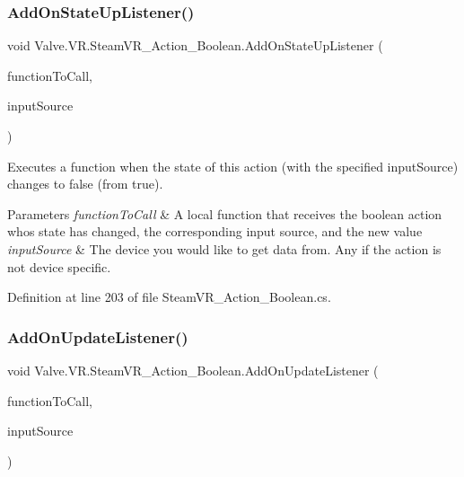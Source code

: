\subsubsection{\texorpdfstring{AddOnStateUpListener()}{AddOnStateUpListener()}}
{\footnotesize\ttfamily void Valve.\+V\+R.\+Steam\+V\+R\+\_\+\+Action\+\_\+\+Boolean.\+Add\+On\+State\+Up\+Listener (\begin{DoxyParamCaption}\item[{\mbox{\hyperlink{class_valve_1_1_v_r_1_1_steam_v_r___action___boolean_a87ebada25dac6016557c3b81e6324b90}{State\+Up\+Handler}}}]{function\+To\+Call,  }\item[{\mbox{\hyperlink{namespace_valve_1_1_v_r_a82e5bf501cc3aa155444ee3f0662853f}{Steam\+V\+R\+\_\+\+Input\+\_\+\+Sources}}}]{input\+Source }\end{DoxyParamCaption})}



Executes a function when the state of this action (with the specified input\+Source) changes to false (from true). 


\begin{DoxyParams}{Parameters}
{\em function\+To\+Call} & A local function that receives the boolean action who\textquotesingle{}s state has changed, the corresponding input source, and the new value\\
\hline
{\em input\+Source} & The device you would like to get data from. Any if the action is not device specific.\\
\hline
\end{DoxyParams}


Definition at line 203 of file Steam\+V\+R\+\_\+\+Action\+\_\+\+Boolean.\+cs.

\mbox{\label{class_valve_1_1_v_r_1_1_steam_v_r___action___boolean_a9cf9ddb16979e031c2f4a6f83da82830}} 
\subsubsection{\texorpdfstring{AddOnUpdateListener()}{AddOnUpdateListener()}}
{\footnotesize\ttfamily void Valve.\+V\+R.\+Steam\+V\+R\+\_\+\+Action\+\_\+\+Boolean.\+Add\+On\+Update\+Listener (\begin{DoxyParamCaption}\item[{\mbox{\hyperlink{class_valve_1_1_v_r_1_1_steam_v_r___action___boolean_ab9ee21a88a5d5d23603465c55796fcf5}{Update\+Handler}}}]{function\+To\+Call,  }\item[{\mbox{\hyperlink{namespace_valve_1_1_v_r_a82e5bf501cc3aa155444ee3f0662853f}{Steam\+V\+R\+\_\+\+Input\+\_\+\+Sources}}}]{input\+Source }\end{DoxyParamCaption})}



